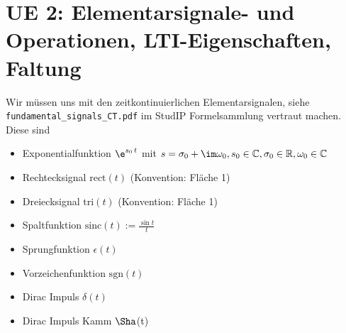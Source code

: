 \newpage
\section{UE 2: Elementarsignale- und Operationen, LTI-Eigenschaften, Faltung}

Wir müssen uns mit den zeitkontinuierlichen Elementarsignalen, siehe \verb|fundamental_signals_CT.pdf|
im StudIP Formelsammlung vertraut machen. Diese sind

\begin{itemize}
  \item Exponentialfunktion
  $\e^{s_0 \, t}$ mit $s=\sigma_0 + \im\omega_0, s_0\in\mathbb{C}, \sigma_0\in\mathbb{R}, \omega_0\in\mathbb{C}$
  \item Rechtecksignal $\mathrm{rect}(t)$ (Konvention: Fläche 1)
  \item Dreiecksignal $\mathrm{tri}(t)$  (Konvention: Fläche 1)
  \item Spaltfunktion $\mathrm{sinc}(t):=\frac{\sin t}{t}$
  \item Sprungfunktion $\epsilon(t)$
  \item Vorzeichenfunktion $\mathrm{sgn}(t)$
  \item Dirac Impuls $\delta(t)$
  \item Dirac Impuls Kamm $\Sha$(t)
\end{itemize}








\newpage

